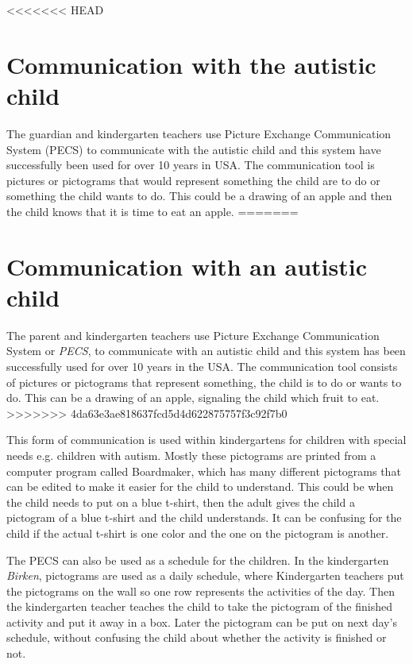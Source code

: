 <<<<<<< HEAD
\section{Communication with the autistic child}
The guardian and kindergarten teachers use Picture Exchange Communication System (PECS) to communicate with the autistic child and this system have successfully been used for over 10 years in USA\cite{centerAutism}. The communication tool is pictures or pictograms that would represent something the child are to do or something the child wants to do. This could be a drawing of an apple and then the child knows that it is time to eat an apple. 
=======
\section{Communication with an autistic child}
The parent and kindergarten teachers use Picture Exchange Communication System or \textit{PECS}, to communicate with an autistic child and this system has been successfully used for over 10 years in the USA. The communication tool consists of pictures or pictograms that represent something, the child is to do or wants to do. This can be a drawing of an apple, signaling the child which fruit to eat. 
>>>>>>> 4da63e3ae818637fcd5d4d622875757f3c92f7b0

This form of communication is used within kindergartens for children with special needs e.g. children with autism. Mostly these pictograms are printed from a computer program called Boardmaker, which has many different pictograms that can be edited to make it easier for the child to understand. This could be when the child needs to put on a blue t-shirt, then the adult gives the child a pictogram of a blue t-shirt and the child understands. It can be confusing for the child if the actual t-shirt is one color and the one on the pictogram is another.

The PECS can also be used as a schedule for the children. In the kindergarten \textit{Birken}, pictograms are used as a daily schedule, where Kindergarten teachers put the pictograms on the wall so one row represents the activities of the day. Then the kindergarten teacher teaches the child to take the pictogram of the finished activity and put it away in a box. Later the pictogram can be put on next day's schedule, without confusing the child about whether the activity is finished or not.
